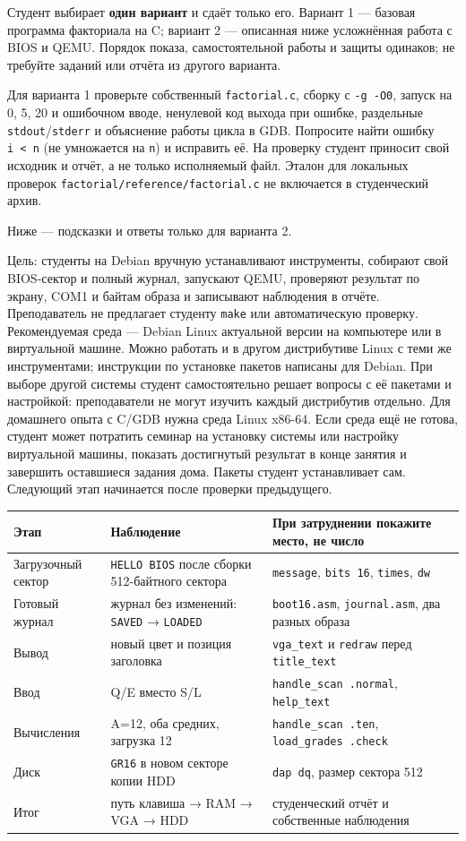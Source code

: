Студент выбирает \textbf{один вариант} и сдаёт только его. Вариант 1 ---
базовая программа факториала на C; вариант 2 --- описанная ниже
усложнённая работа с BIOS и QEMU. Порядок показа,
самостоятельной работы и защиты одинаков; не требуйте заданий или
отчёта из другого варианта.

Для варианта 1 проверьте собственный \texttt{factorial.c}, сборку с
\texttt{-g\ -O0}, запуск на 0, 5, 20 и ошибочном вводе, ненулевой код
выхода при ошибке, раздельные \texttt{stdout}/\texttt{stderr} и
объяснение работы цикла в GDB. Попросите найти ошибку
\texttt{i\ \textless{}\ n} (не умножается на \texttt{n}) и исправить её.
На проверку студент приносит свой исходник и отчёт, а не только
исполняемый файл. Эталон для локальных проверок
\texttt{factorial/reference/factorial.c} не включается в студенческий
архив.

Ниже --- подсказки и ответы только для варианта 2.

Цель: студенты на Debian вручную устанавливают инструменты, собирают
свой BIOS-сектор и полный журнал, запускают QEMU, проверяют результат по
экрану, COM1 и байтам образа и записывают наблюдения в отчёте.
Преподаватель не предлагает студенту \texttt{make} или автоматическую
проверку. Рекомендуемая среда --- Debian Linux актуальной версии на
компьютере или в виртуальной машине. Можно работать и в другом
дистрибутиве Linux с теми же инструментами; инструкции по установке
пакетов написаны для Debian. При выборе другой системы студент
самостоятельно решает вопросы с её пакетами и настройкой: преподаватели
не могут изучить каждый дистрибутив отдельно. Для домашнего опыта с
C/GDB нужна среда Linux x86-64. Если среда ещё не готова, студент может
потратить семинар на установку системы или настройку виртуальной машины,
показать достигнутый результат в конце занятия и завершить оставшиеся
задания дома. Пакеты студент устанавливает сам. Следующий этап
начинается после проверки предыдущего.

\begin{longtable}[]{@{}p{.19\linewidth}p{.27\linewidth}p{.43\linewidth}@{}}
\toprule
Этап & Наблюдение & При затруднении покажите место, не число \\
\midrule
\endhead
Загрузочный сектор & \texttt{HELLO\ BIOS} после сборки 512-байтного
сектора & \texttt{message}, \texttt{bits\ 16}, \texttt{times},
\texttt{dw} \\
Готовый журнал & журнал без изменений: \texttt{SAVED} → \texttt{LOADED}
& \texttt{boot16.asm}, \texttt{journal.asm}, два разных образа \\
Вывод & новый цвет и позиция заголовка & \texttt{vga\_text} и
\texttt{redraw} перед \texttt{title\_text} \\
Ввод & Q/E вместо S/L & \texttt{handle\_scan\ .normal},
\texttt{help\_text} \\
Вычисления & A=12, оба средних, загрузка 12 &
\texttt{handle\_scan\ .ten}, \texttt{load\_grades\ .check} \\
Диск & \texttt{GR16} в новом секторе копии HDD & \texttt{dap\ dq},
размер сектора 512 \\
Итог & путь клавиша → RAM → VGA → HDD & студенческий отчёт и собственные
наблюдения \\
\bottomrule
\end{longtable}

